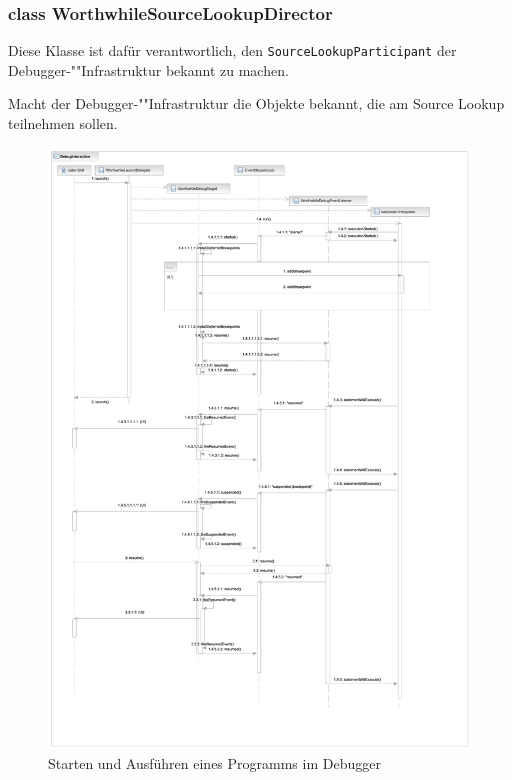 \subsubsection{class WorthwhileSourceLookupDirector}

Diese Klasse ist dafür verantwortlich, den \texttt{SourceLookupParticipant} der Debugger-""Infrastruktur bekannt zu machen.

\begin{description}
	 Macht der Debugger-""Infrastruktur die Objekte bekannt, die am Source Lookup teilnehmen sollen.
\end{description}

\begin{figure}
	\caption{Starten und Ausführen eines Programms im Debugger}
	\includegraphics[height=\textheight]{diagrams/debug_sequence.pdf}
\end{figure}
